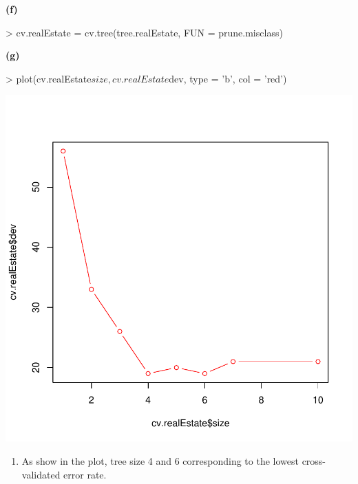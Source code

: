 \documentclass[a4paper]{article}
\renewcommand{\part}[1] {\vspace{.10in} {\bf (#1)}}
\begin{document}
\part{f}
\begin{Schunk}
\begin{Sinput}
> cv.realEstate = cv.tree(tree.realEstate, FUN = prune.misclass)
\end{Sinput}
\end{Schunk}


\part{g}
\begin{Schunk}
\begin{Sinput}
> plot(cv.realEstate$size, cv.realEstate$dev, type = 'b', col = 'red')
\end{Sinput}
\end{Schunk}
\includegraphics{tree-1g}
{\color{red}
\begin{enumerate}
\item As show in the plot, tree size 4 and 6 corresponding to the lowest cross-validated error rate.
\end{enumerate}
}
\end{document}
